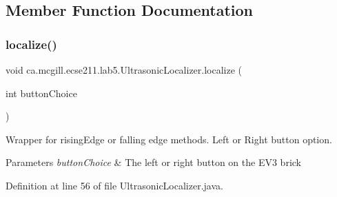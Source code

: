 \subsection{Member Function Documentation}
\mbox{\label{classca_1_1mcgill_1_1ecse211_1_1lab5_1_1_ultrasonic_localizer_a7fd82ab7240a07ae6947313c0769d4bc}} 
\subsubsection{\texorpdfstring{localize()}{localize()}}
{\footnotesize\ttfamily void ca.\+mcgill.\+ecse211.\+lab5.\+Ultrasonic\+Localizer.\+localize (\begin{DoxyParamCaption}\item[{int}]{button\+Choice }\end{DoxyParamCaption})}

Wrapper for rising\+Edge or falling edge methods. Left or Right button option.


\begin{DoxyParams}{Parameters}
{\em button\+Choice} & The left or right button on the E\+V3 brick \\
\hline
\end{DoxyParams}


Definition at line 56 of file Ultrasonic\+Localizer.\+java.

